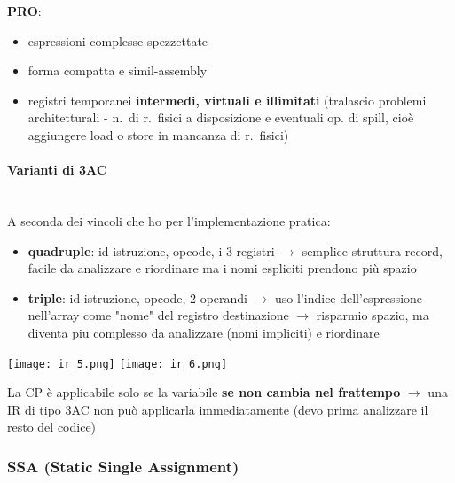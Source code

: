 \textbf{PRO}:
\begin{itemize}
  \item espressioni complesse spezzettate
  \item forma compatta e simil-assembly
  \item registri temporanei \textbf{intermedi, virtuali e illimitati} (tralascio problemi architetturali - n.~di r.~fisici a disposizione e eventuali op. di spill, cio\`e aggiungere load o store in mancanza di r.~fisici)
\end{itemize}

\paragraph{Varianti di 3AC}~\\

A seconda dei vincoli che ho per l'implementazione pratica:

\noindent\begin{minipage}[c]{.7\textwidth}
\begin{itemize}
  \item \textbf{quadruple}: id istruzione, opcode, i 3 registri $\rightarrow$ semplice struttura record, facile da analizzare e riordinare ma i nomi espliciti prendono pi\`u spazio
  \item \textbf{triple}: id istruzione, opcode, 2 operandi $\rightarrow$ uso l'indice dell'espressione nell'array come "nome" del registro destinazione $\rightarrow$ risparmio spazio, ma diventa piu complesso da analizzare (nomi impliciti) e riordinare
\end{itemize}
\end{minipage}
\begin{minipage}[c]{.3\textwidth}
\centering
\texttt{[image: ir\_5.png]}
\texttt{[image: ir\_6.png]}
\end{minipage}


\begin{emphasize}[frametitle={Inapplicabilit\`a diretta della Constant Propagation con forma 3AC}]
  La CP \`e applicabile solo se la variabile \textbf{se non cambia nel frattempo} $\rightarrow$ una IR di tipo 3AC non pu\`o applicarla immediatamente (devo prima analizzare il resto del codice)
\end{emphasize}

\subsubsection{SSA (Static Single Assignment)}

